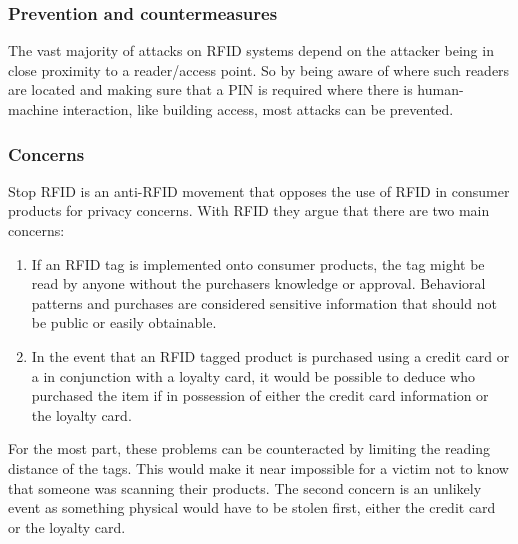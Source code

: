 \subsubsection{Prevention and countermeasures}

The vast majority of attacks on RFID systems depend on the attacker being in close proximity to a reader/access point. So by being aware of where such readers are located and making sure that a PIN is required where there is human-machine interaction, like building access, most attacks can be prevented.

\subsubsection{Concerns}


Stop RFID is an anti-RFID movement that opposes the use of RFID in consumer products for privacy concerns. With RFID they argue that there are two main concerns:


\begin{enumerate}
    \item If an RFID tag is implemented onto consumer products, the tag might be read by anyone without the purchasers knowledge or approval. Behavioral patterns and purchases are considered sensitive information that should not be public or easily obtainable.
    \item In the event that an RFID tagged product is purchased using a credit card or a in conjunction with a loyalty card, it would be possible to deduce who purchased the item if in possession of either the credit card information or the loyalty card.
\end{enumerate}

For the most part, these problems can be counteracted by limiting the reading distance of the tags. This would make it near impossible for a victim not to know that someone was scanning their products. The second concern is an unlikely event as something physical would have to be stolen first, either the credit card or the loyalty card.

